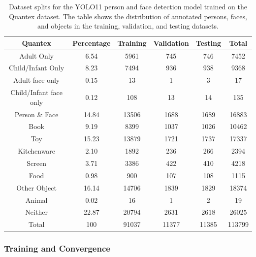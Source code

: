 \documentclass[
  man,floatsintext]{apa6}
\begin{document}
\begin{table}[tbp]

\begin{center}
\begin{threeparttable}

\caption{\label{tab:person-dataset-splits}Dataset splits for the YOLO11 person and face detection model trained on the Quantex dataset. The table shows the distribution of annotated persons, faces, and objects in the training, validation, and testing datasets.}

\begin{tabular}{cccccc}
\toprule
Quantex & \multicolumn{1}{c}{Percentage} & \multicolumn{1}{c}{Training} & \multicolumn{1}{c}{Validation} & \multicolumn{1}{c}{Testing} & \multicolumn{1}{c}{Total}\\
\midrule
Adult Only & 6.54 & 5961 & 745 & 746 & 7452\\
Child/Infant Only & 8.23 & 7494 & 936 & 938 & 9368\\
Adult face only & 0.15 & 13 & 1 & 3 & 17\\
Child/Infant face only & 0.12 & 108 & 13 & 14 & 135\\
Person \& Face & 14.84 & 13506 & 1688 & 1689 & 16883\\
Book & 9.19 & 8399 & 1037 & 1026 & 10462\\
Toy & 15.23 & 13879 & 1721 & 1737 & 17337\\
Kitchenware & 2.10 & 1892 & 236 & 266 & 2394\\
Screen & 3.71 & 3386 & 422 & 410 & 4218\\
Food & 0.98 & 900 & 107 & 108 & 1115\\
Other Object & 16.14 & 14706 & 1839 & 1829 & 18374\\
Animal & 0.02 & 16 & 1 & 2 & 19\\
Neither & 22.87 & 20794 & 2631 & 2618 & 26025\\
Total & 100 & 91037 & 11377 & 11385 & 113799\\
\bottomrule
\end{tabular}

\end{threeparttable}
\end{center}

\end{table}

\subsubsection{Training and Convergence}\label{training-and-convergence}
\end{document}
